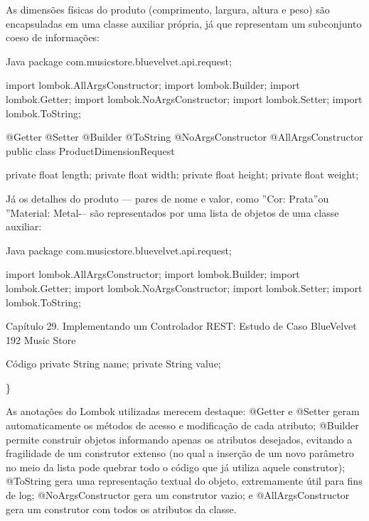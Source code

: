 As dimensões físicas do produto (comprimento, largura, altura e peso) são encapsuladas em uma classe auxiliar própria, já que representam um subconjunto coeso de informações:

\begin{codebox}{Java}
package com.musicstore.bluevelvet.api.request;

import lombok.AllArgsConstructor;
import lombok.Builder;
import lombok.Getter;
import lombok.NoArgsConstructor;
import lombok.Setter;
import lombok.ToString;

@Getter
@Setter
@Builder
@ToString
@NoArgsConstructor
@AllArgsConstructor
public class ProductDimensionRequest {

       private float length;
       private float width;
       private float height;
       private float weight;

}
\end{codebox}

Já os detalhes do produto — pares de nome e valor, como ”Cor: Prata”ou ”Material: Metal-– são representados por uma lista de objetos de uma classe auxiliar:

\begin{codebox}{Java}
package com.musicstore.bluevelvet.api.request;

import lombok.AllArgsConstructor;
import lombok.Builder;
import lombok.Getter;
import lombok.NoArgsConstructor;
import lombok.Setter;
import lombok.ToString;
\end{codebox}

Capítulo 29. Implementando um Controlador REST: Estudo de Caso BlueVelvet 192 Music Store

\begin{codebox}{Código}
@Getter
@Setter
@Builder
@ToString
@NoArgsConstructor
@AllArgsConstructor
public class ProductDetailRequest {
\end{codebox}

\begin{codebox}{Código}
private String name;
private String value;
\end{codebox}

\}

As anotações do Lombok utilizadas merecem destaque: @Getter e @Setter geram automaticamente os métodos de acesso e modificação de cada atributo; @Builder permite construir objetos informando apenas os atributos desejados, evitando a fragilidade de um construtor extenso (no qual a inserção de um novo parâmetro no meio da lista pode quebrar todo o código que já utiliza aquele construtor); @ToString gera uma representação textual do objeto, extremamente útil para fins de log; @NoArgsConstructor gera um construtor vazio; e @AllArgsConstructor gera um construtor com todos os atributos da classe.


